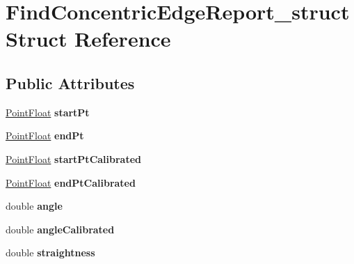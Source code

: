 \hypertarget{structFindConcentricEdgeReport__struct}{
\section{FindConcentricEdgeReport\_\-struct Struct Reference}
\label{structFindConcentricEdgeReport__struct}
}
\subsection*{Public Attributes}
\begin{DoxyCompactItemize}
\item 
\hypertarget{structFindConcentricEdgeReport__struct_a46d553e81eaa0f4bd78188ff7fdb2093}{
\hyperlink{structPointFloat__struct}{PointFloat} {\bfseries startPt}}
\label{structFindConcentricEdgeReport__struct_a46d553e81eaa0f4bd78188ff7fdb2093}

\item 
\hypertarget{structFindConcentricEdgeReport__struct_a5694d467a607b9a3889d6505171b8ff4}{
\hyperlink{structPointFloat__struct}{PointFloat} {\bfseries endPt}}
\label{structFindConcentricEdgeReport__struct_a5694d467a607b9a3889d6505171b8ff4}

\item 
\hypertarget{structFindConcentricEdgeReport__struct_aa85186eff46972e2d98e060bb32bce6f}{
\hyperlink{structPointFloat__struct}{PointFloat} {\bfseries startPtCalibrated}}
\label{structFindConcentricEdgeReport__struct_aa85186eff46972e2d98e060bb32bce6f}

\item 
\hypertarget{structFindConcentricEdgeReport__struct_a6e99aee752a9effe2c25b73036198736}{
\hyperlink{structPointFloat__struct}{PointFloat} {\bfseries endPtCalibrated}}
\label{structFindConcentricEdgeReport__struct_a6e99aee752a9effe2c25b73036198736}

\item 
\hypertarget{structFindConcentricEdgeReport__struct_a4b5090b79eaca158f9a775aed64116fc}{
double {\bfseries angle}}
\label{structFindConcentricEdgeReport__struct_a4b5090b79eaca158f9a775aed64116fc}

\item 
\hypertarget{structFindConcentricEdgeReport__struct_a12992ef0b3553c1e8ae6966ec6c9049e}{
double {\bfseries angleCalibrated}}
\label{structFindConcentricEdgeReport__struct_a12992ef0b3553c1e8ae6966ec6c9049e}

\item 
\hypertarget{structFindConcentricEdgeReport__struct_a3ba64074d959dbccf109c0e4ca57a5de}{
double {\bfseries straightness}}
\label{structFindConcentricEdgeReport__struct_a3ba64074d959dbccf109c0e4ca57a5de}


\end{DoxyCompactItemize}
